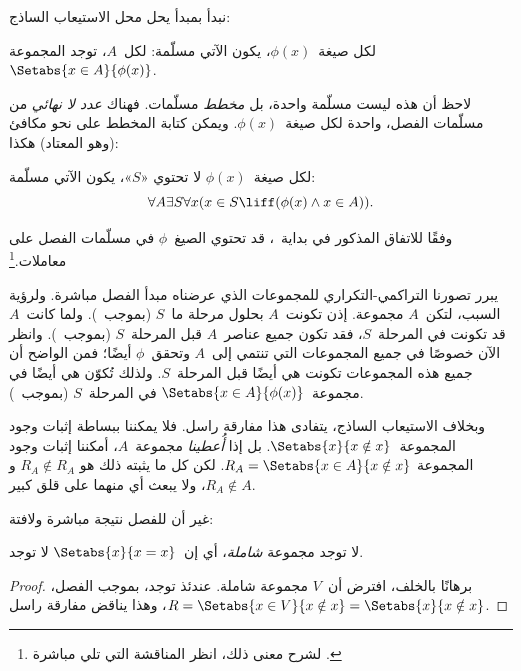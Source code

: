\documentclass[../../../include/open-logic-section]{subfiles}
\begin{document}

نبدأ بمبدأ يحل محل الاستيعاب الساذج:

\begin{axiom} لكل صيغة~$\phi(x)$، يكون الآتي مسلّمة:
لكل~$A$، توجد المجموعة~$\Setabs{x \in A}{\phi(x)}$.
\end{axiom}

لاحظ أن هذه ليست مسلّمة واحدة، بل \emph{مخطط} مسلّمات. فهناك
\emph{عدد لا نهائي} من مسلّمات الفصل، واحدة لكل صيغة~$\phi(x)$.
ويمكن كتابة المخطط على نحو مكافئ (وهو المعتاد) هكذا:

\begin{defish}
لكل صيغة~$\phi(x)$ لا تحتوي «$S$»، يكون الآتي مسلّمة:
\[
	\forall A \exists S \forall x(x \in S \liff (\phi(x) \land x \in A)).
\]
\end{defish}

وفقًا للاتفاق المذكور في بداية~، قد تحتوي
الصيغ~$\phi$ في مسلّمات الفصل على معاملات.\footnote{لشرح معنى ذلك،
  انظر المناقشة التي تلي مباشرة
  .}

يبرر تصورنا التراكمي-التكراري للمجموعات الذي عرضناه مبدأ الفصل مباشرة.
ولرؤية السبب، لتكن~$A$ مجموعة. إذن تكونت~$A$ بحلول مرحلة ما~$S$
(بموجب~\stageshier). ولما كانت~$A$ قد تكونت في المرحلة~$S$، فقد
تكون جميع عناصر~$A$ قبل المرحلة~$S$ (بموجب~\stagesacc). وانظر الآن
خصوصًا في جميع المجموعات التي تنتمي إلى~$A$ وتحقق~$\phi$ أيضًا؛ فمن
الواضح أن جميع هذه المجموعات تكونت هي أيضًا قبل المرحلة~$S$. ولذلك
تُكوّن هي أيضًا في مجموعة~$\Setabs{x \in A}{\phi(x)}$ في المرحلة~$S$
(بموجب~\stagesacc).

وبخلاف الاستيعاب الساذج، يتفادى هذا مفارقة راسل. فلا يمكننا ببساطة
إثبات وجود المجموعة~$\Setabs{x}{x \notin x}$. بل إذا \emph{أُعطينا}
مجموعة~$A$، أمكننا إثبات وجود المجموعة
$R_A = \Setabs{x \in A}{x \notin x}$. لكن كل ما يثبته ذلك هو
$R_A \notin R_A$ و$R_A \notin A$، ولا يبعث أي منهما على قلق كبير.

غير أن للفصل نتيجة مباشرة ولافتة:

\begin{thm}
لا توجد مجموعة \emph{شاملة}، أي إن~$\Setabs{x}{x = x}$ لا توجد.
\end{thm}

\begin{proof}
برهانًا بالخلف، افترض أن~$V$ مجموعة شاملة. عندئذ توجد، بموجب الفصل،
$R = \Setabs{x \in V}{x \notin x} = \Setabs{x}{x \notin x}$،
وهذا يناقض مفارقة راسل.
\end{proof}
\end{document}
